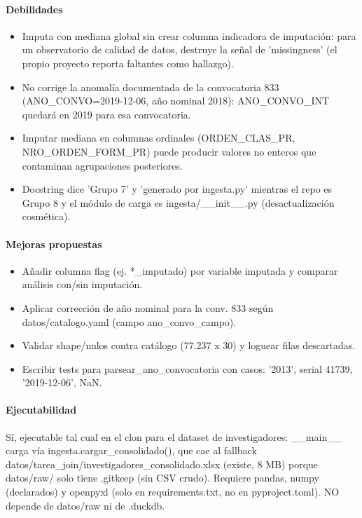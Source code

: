 \paragraph{Debilidades}
\begin{itemize}
  \item Imputa con mediana global sin crear columna indicadora de imputación: para un observatorio de calidad de datos, destruye la señal de 'missingness' (el propio proyecto reporta faltantes como hallazgo).
  \item No corrige la anomalía documentada de la convocatoria 833 (ANO\_CONVO=2019-12-06, año nominal 2018): ANO\_CONVO\_INT quedará en 2019 para esa convocatoria.
  \item Imputar mediana en columnas ordinales (ORDEN\_CLAS\_PR, NRO\_ORDEN\_FORM\_PR) puede producir valores no enteros que contaminan agrupaciones posteriores.
  \item Docstring dice 'Grupo 7' y 'generado por ingesta.py' mientras el repo es Grupo 8 y el módulo de carga es ingesta/\_\_init\_\_.py (desactualización cosmética).
\end{itemize}

\paragraph{Mejoras propuestas}
\begin{itemize}
  \item Añadir columna flag (ej. *\_imputado) por variable imputada y comparar análisis con/sin imputación.
  \item Aplicar corrección de año nominal para la conv. 833 según datos/catalogo.yaml (campo ano\_convo\_campo).
  \item Validar shape/nulos contra catálogo (77.237 x 30) y loguear filas descartadas.
  \item Escribir tests para parsear\_ano\_convocatoria con casos: '2013', serial 41739, '2019-12-06', NaN.
\end{itemize}

\paragraph{Ejecutabilidad}
Sí, ejecutable tal cual en el clon para el dataset de investigadores: \_\_main\_\_ carga vía ingesta.cargar\_consolidado(), que cae al fallback datos/tarea\_join/investigadores\_consolidado.xlsx (existe, 8 MB) porque datos/raw/ solo tiene .gitkeep (sin CSV crudo). Requiere pandas, numpy (declarados) y openpyxl (solo en requirements.txt, no en pyproject.toml). NO depende de datos/raw ni de .duckdb.


